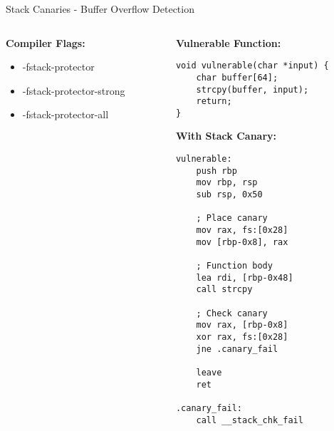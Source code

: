 \documentclass[aspectratio=169,12pt]{beamer}
\begin{document}
\begin{frame}[fragile]{Stack Canaries - Buffer Overflow Detection}
\begin{columns}
\begin{column}{0.5\textwidth}
            \vspace{0.3cm}
            \textbf{Compiler Flags:}
            \begin{itemize}
                \item -fstack-protector
                \item -fstack-protector-strong
                \item -fstack-protector-all
            \end{itemize}
        \end{column}
        \begin{column}{0.5\textwidth}
            \begin{tcolorbox}[colback=blue!10]
                \small
                \textbf{Vulnerable Function:}
                \begin{verbatim}
void vulnerable(char *input) {
    char buffer[64];
    strcpy(buffer, input);
    return;
}
                \end{verbatim}
            \end{tcolorbox}
            
            \begin{tcolorbox}[colback=green!10]
                \small
                \textbf{With Stack Canary:}
                \begin{verbatim}
vulnerable:
    push rbp
    mov rbp, rsp
    sub rsp, 0x50
    
    ; Place canary
    mov rax, fs:[0x28]
    mov [rbp-0x8], rax
    
    ; Function body
    lea rdi, [rbp-0x48]
    call strcpy
    
    ; Check canary
    mov rax, [rbp-0x8]
    xor rax, fs:[0x28]
    jne .canary_fail
    
    leave
    ret
    
.canary_fail:
    call __stack_chk_fail
                \end{verbatim}
            \end{tcolorbox}
        \end{column}
    \end{columns}
\end{frame}
\end{document}
